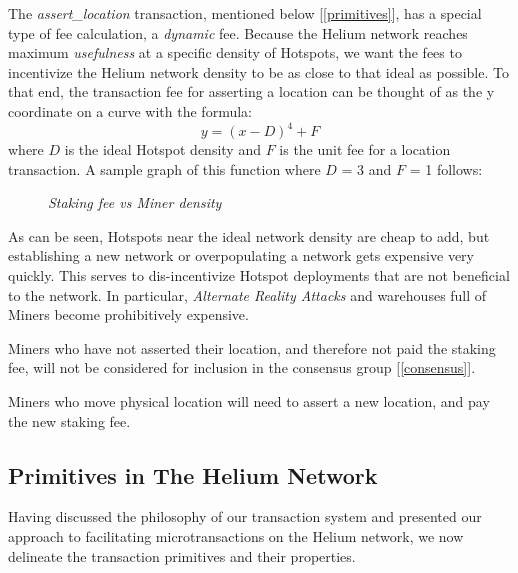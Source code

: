 \documentclass[10pt, nonatbib, nocopyrightspace, reprint]{sigplanconf}
\newcommand{\secref}[1]{[\autoref{#1}]}
\begin{document}
The \emph{assert\_location} transaction, mentioned below \secref{primitives}, has a special type of fee calculation, a \emph{dynamic} fee. Because the Helium network reaches maximum \emph{usefulness} at a specific density of Hotspots, we want the fees to incentivize the Helium network density to be as close to that ideal as possible. To that end, the transaction fee for asserting a location can be thought of as the y coordinate on a curve with the formula: \[\mathit{y = \left(x - D\right)^4 + F}\] where $D$ is the ideal Hotspot density and $F$ is the unit fee for a location transaction. A sample graph of this function where $D$ = 3 and $F$ = 1 follows:

\begin{figure}[ht]
  \centering
  \pgfplotsset{width=11cm,compat=newest}
  \caption{\emph{Staking fee vs Miner density}}
\end{figure}


As can be seen, Hotspots near the ideal network density are cheap to add, but establishing a new network or overpopulating a network gets expensive very quickly. This serves to dis-incentivize Hotspot deployments that are not beneficial to the network. In particular, \emph{Alternate Reality Attacks} and warehouses full of Miners become prohibitively expensive.

Miners who have not asserted their location, and therefore not paid the staking fee, will not be considered for inclusion in the consensus group \secref{consensus}.

Miners who move physical location will need to assert a new location, and pay the new staking fee.

\subsection{Primitives in The Helium Network} \label{primitives}
Having discussed the philosophy of our transaction system and presented our approach to facilitating microtransactions on the Helium network, we now delineate the transaction primitives and their properties.
\end{document}
